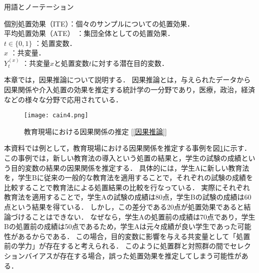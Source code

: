 \documentclass[dvipdfmx]{jreport}
\begin{document}
\begin{itembox}[l]{\large{用語とノーテーション}}
\begin{tabbing}
        \hspace{15pt} \raisebox{0.5ex}{\tiny $\bullet$} 個別処置効果（ITE）\>：個々のサンプルについての処置効果．\\[0.5em]
        \hspace{15pt} \raisebox{0.5ex}{\tiny $\bullet$} 平均処置効果（ATE） \>：集団全体としての処置効果．\\[0.5em]
        \hspace{15pt} \raisebox{0.5ex}{\tiny $\bullet$} $t \in \{0, 1\}$ \>：処置変数．\\[0.5em]
        \hspace{15pt} \raisebox{0.5ex}{\tiny $\bullet$} $x$ \>：共変量．\\[0.5em]
        \hspace{15pt} \raisebox{0.5ex}{\tiny $\bullet$} $Y_t^{(x)}$ \>：共変量$x$と処置変数$t$に対する潜在目的変数．
    \end{tabbing}
\end{itembox}

本章では，因果推論について説明する．
因果推論とは，与えられたデータから因果関係や介入処置の効果を推定する統計学の一分野であり，医療，政治，経済などの様々な分野で応用されている．

\begin{figure}[h]
    \begin{center}
        \texttt{[image: cain4.png]}
    \end{center}
    \caption{教育現場における因果関係の推定 [\ref{因果推論}]} \label{fig:因果推論}
\end{figure}

本資料では例として，教育現場における因果関係を推定する事例を図\ref{fig:因果推論}に示す．
この事例では，新しい教育法の導入という処置の結果と，学生の試験の成績という目的変数の結果の因果関係を推定する．
具体的には，学生Aに新しい教育法を，学生Bに従来の一般的な教育法を適用することで，それぞれの試験の成績を比較することで教育法による処置結果の比較を行なっている．
実際にそれぞれ教育法を適用することで，学生Aの試験の成績は80点，学生Bの試験の成績は60点という結果を得ている．
しかし，この差分である20点が処置効果であると結論づけることはできない．
なぜなら，学生Aの処置前の成績は70点であり，学生Bの処置前の成績は50点であるため，学生Aは元々成績が良い学生であった可能性があるからである．
この場合，目的変数に影響を与える共変量として「処置前の学力」が存在すると考えられる．
このように処置群と対照群の間でセレクションバイアスが存在する場合，誤った処置効果を推定してしまう可能性がある．
\end{document}
